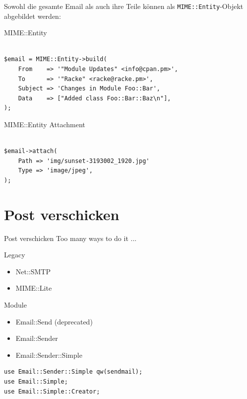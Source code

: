 Sowohl die gesamte Email als auch ihre Teile können als
\verb|MIME::Entity|-Objekt abgebildet werden:

\begin{frame}[fragile]{MIME::Entity}
  \begin{verbatim}

$email = MIME::Entity->build(
    From    => '"Module Updates" <info@cpan.pm>',
    To      => '"Racke" <racke@racke.pm>',
    Subject => 'Changes in Module Foo::Bar',
    Data    => ["Added class Foo::Bar::Baz\n"],
);
  \end{verbatim}
\end{frame}

\begin{frame}[fragile]{MIME::Entity Attachment}
  \begin{verbatim}

$email->attach(
    Path => 'img/sunset-3193002_1920.jpg'
    Type => 'image/jpeg',
);

  \end{verbatim}
\end{frame}

\section{Post verschicken}

\begin{frame}{Post verschicken}
  Too many ways to do it ...
\end{frame}

\begin{frame}{Legacy}
  \begin{itemize}
    \item Net::SMTP
    \item MIME::Lite
  \end{itemize}
\end{frame}

\begin{frame}{Module}
  \begin{itemize}
  \item Email::Send (deprecated)
  \item Email::Sender
  \item Email::Sender::Simple
  \end{itemize}
\end{frame}

\begin{lstlisting}
use Email::Sender::Simple qw(sendmail);
use Email::Simple;
use Email::Simple::Creator;
\end{lstlisting}

